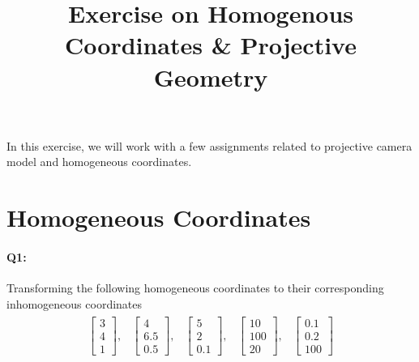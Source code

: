 \documentclass[a4paper]{article}
\begin{document}
\title{Exercise on Homogenous Coordinates \& Projective Geometry}
\maketitle%

In this exercise, we will work with a few assignments related to projective camera model and homogeneous coordinates.

\section{Homogeneous Coordinates}
\paragraph{Q1:} Transforming the following homogeneous coordinates to their corresponding inhomogeneous coordinates
\begin{align}
\begin{matrix}
\left[ \begin{matrix} 3 \\ 4 \\ 1\end{matrix}\right], & 
\left[ \begin{matrix} 4 \\ 6.5 \\ 0.5 \end{matrix}\right], &
\left[ \begin{matrix} 5 \\ 2 \\ 0.1 \end{matrix}\right], &
\left[ \begin{matrix} 10 \\ 100 \\ 20 \end{matrix}\right], &
\left[ \begin{matrix} 0.1 \\ 0.2 \\ 100 \end{matrix}\right]
\end{matrix} \nonumber
\end{align} 
\end{document}
